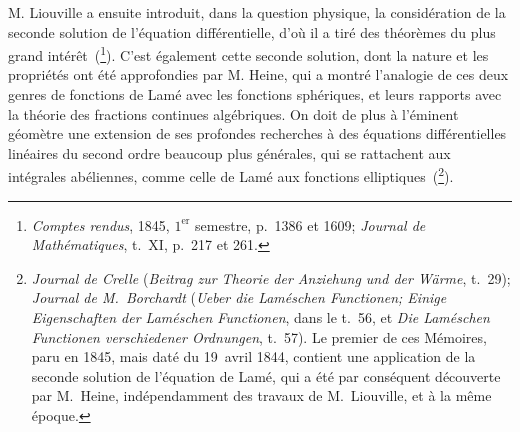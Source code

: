 \documentclass[11pt,leqno,oneside,letterpaper]{book}[2005/09/16]
\begin{document}
M. Liouville a ensuite introduit, dans la question physique, la con\-sid\'era\-tion
de la seconde solution de l'\'equation diff\'erentielle, d'o\`u il a tir\'e des
th\'eor\`emes du plus grand int\'er\^et~(\footnote{
  \textit{Comptes rendus}, 1845, $1^{\text{er}}$ semestre, p.~1386
  et 1609; \textit{Journal de Math\'ematiques}, t.~XI, p.~217 et 261.}).
C'est \'egalement cette seconde solution,
dont la nature et les propri\'et\'es ont \'et\'e approfondies par M. Heine,
qui a montr\'e l'analogie de ces deux genres de fonctions de Lam\'e avec
les fonctions sph\'eriques, et leurs rapports avec la th\'eorie des fractions continues
alg\'ebriques. On doit de plus \`a l'\'eminent g\'eom\`etre une extension
de ses profondes recherches \`a des \'equations diff\'erentielles lin\'eaires du
second ordre beaucoup plus g\'en\'erales, qui se rattachent aux int\'egrales
ab\'eliennes, comme celle de Lam\'e aux fonctions elliptiques~(\footnote{
  \textit{Journal de Crelle} (\textit{Beitrag zur Theorie der Anziehung und der W\"arme}, t.~29);
\textit{Journal de M.~Borchardt} (\textit{Ueber die Lam\'eschen Functionen; Einige Eigenschaften der
Lam\'eschen Functionen}, dans le t.~56, et \textit{Die Lam\'eschen Functionen verschiedener Ordnungen}, t.~57). Le premier de ces M\'emoires, paru en 1845, mais dat\'e du 19~avril 1844, contient
une application de la seconde solution de l'\'equation de Lam\'e, qui a \'et\'e par cons\'equent
d\'ecouverte par M.~Heine, ind\'ependamment des travaux de M.~Liouville, et \`a la m\^eme \'epoque.}).
\end{document}
